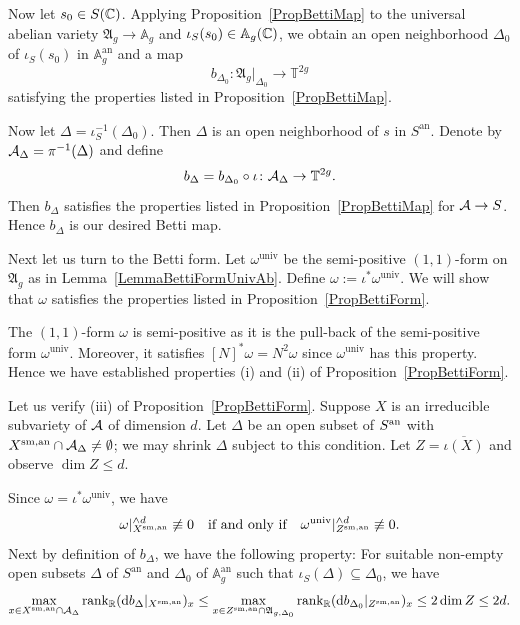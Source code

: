 Now let $s_0 \in S({\mathbb{C}})$. Applying Proposition~\ref{PropBettiMap} to the universal abelian variety $\mathfrak{A}_g \rightarrow \mathbb A_g$ and $\iota_S(s_0) \in \mathbb A_g({\mathbb{C}})$, we obtain an open neighborhood $\Delta_0$ of $\iota_S(s_0)$ in $\mathbb A_g^{\mathrm{an}}$ and a map
\[
b_{\Delta_0} \colon \mathfrak{A}_g|_{\Delta_0} \rightarrow \mathbb T^{2g}
\]
satisfying the properties listed in Proposition~\ref{PropBettiMap}.

Now let $\Delta = \iota_S^{-1}(\Delta_0)$. Then $\Delta$ is an open neighborhood of $s$ in $S^{\mathrm{an}}$. Denote by $\mathcal{A}_{\Delta} = \pi^{-1}(\Delta)$ and define
\[
b_{\Delta} = b_{\Delta_0} \circ \iota \colon \mathcal{A}_{\Delta} \rightarrow \mathbb T^{2g}.
\]
Then $b_{\Delta}$ satisfies the properties listed in Proposition~\ref{PropBettiMap} for $\mathcal{A} \rightarrow S$. Hence $b_{\Delta}$ is our desired Betti map.


Next let us turn to the Betti form. Let $\omega^{\mathrm{univ}}$ be the semi-positive $(1,1)$-form on $\mathfrak{A}_g$ as in Lemma~\ref{LemmaBettiFormUnivAb}. Define $\omega:= \iota^*\omega^{\mathrm{univ}}$. We will show that $\omega$ satisfies the properties listed in Proposition~\ref{PropBettiForm}.

The $(1,1)$-form $\omega$ is semi-positive as it is the pull-back of
the semi-positive form $\omega^{\mathrm{univ}}$. Moreover, it satisfies
$[N]^*\omega = N^2 \omega$ since $\omega^{\mathrm{univ}}$ has this
property. Hence we have established properties (i) and (ii) of
Proposition~\ref{PropBettiForm}.

Let us verify (iii) of Proposition~\ref{PropBettiForm}. Suppose $X$ is
an irreducible subvariety of $\mathcal{A}$ of dimension $d$.
Let $\Delta$ be an open subset of ${S}^{\mathrm{an}}$ with
${X}^{\mathrm{sm,an}}\cap\mathcal{A}_\Delta\not=\emptyset$; we may shrink $\Delta$ subject
to this condition. 
Let $Z
= \overline{\iota(X)}$ and observe $\dim Z \le d$. 

Since $\omega = \iota^*\omega^{\mathrm{univ}}$, we have
\begin{equation}\label{EqOmegaAndOmegaUniv}
\omega|_{{X}^{\mathrm{sm,an}}}^{\wedge d} \not\equiv 0 \quad\text{if and only if}\quad \omega^{\mathrm{univ}}|_{{Z}^{\mathrm{sm,an}}}^{\wedge d} \not\equiv 0.
\end{equation}
Next by definition of $b_{\Delta}$, we have the following property:
 For suitable non-empty open subsets $\Delta$ of $S^{\mathrm{an}}$ and
 $\Delta_0$ of $\mathbb{A}_g^{\mathrm{an}}$
 such that $\iota_S(\Delta) \subseteq \Delta_0$, we have
\begin{equation}\label{EqBettiRankTrivialBound}
\max_{x \in {X}^{\mathrm{sm,an}} \cap \mathcal{A}_{\Delta}} \mathrm{rank}_{{\mathbb{R}}}
(\mathrm{d}b_{\Delta}|_{{X}^{\mathrm{sm,an}}})_x
\le \max_{x \in {Z}^{\mathrm{sm,an}} \cap \mathfrak{A}_{g,\Delta_0}} \mathrm{rank}_{{\mathbb{R}}} (\mathrm{d}b_{\Delta_0}|_{Z^{\mathrm{sm,an}}})_x \le 2\dim Z \le 2d.
\end{equation}

